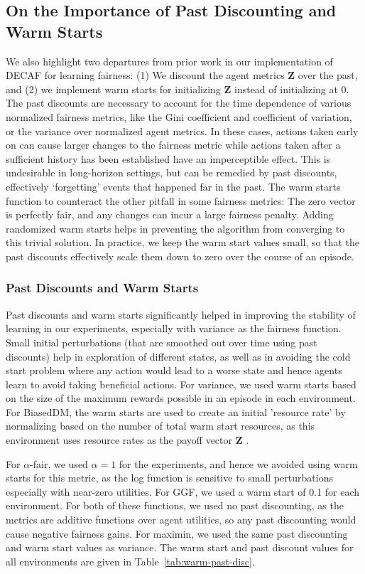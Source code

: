 \subsection{On the Importance of Past Discounting and Warm Starts}
We also highlight two departures from prior work in our implementation of DECAF for learning fairness: (1) We discount the agent metrics $\textbf{Z}$ over the past, and (2) we implement warm starts for initializing $\textbf{Z}$ instead of initializing at 0. The past discounts are necessary to account for the time dependence of various normalized fairness metrics, like the Gini coefficient and coefficient of variation, or the variance over normalized agent metrics. In these cases, actions taken early on can cause larger changes to the fairness metric while actions taken after a sufficient history has been established have an imperceptible effect. This is undesirable in long-horizon settings, but can be remedied by past discounts, effectively `forgetting' events that happened far in the past. The warm starts function to counteract the other pitfall in some fairness metrics: The zero vector is perfectly fair, and any changes can incur a large fairness penalty. Adding randomized warm starts helps in preventing the algorithm from converging to this trivial solution. In practice, we keep the warm start values small, so that the past discounts effectively scale them down to zero over the course of an episode.

\subsubsection{Past Discounts and Warm Starts}
Past discounts and warm starts significantly helped in improving the stability of learning in our experiments, especially with variance as the fairness function. Small initial perturbations (that are smoothed out over time using past discounts) help in exploration of different states, as well as in avoiding the cold start problem where any action would lead to a worse state and hence agents learn to avoid taking beneficial actions. For variance, we used warm starts based on the size of the maximum rewards possible in an episode in each environment. For BiasedDM, the warm starts are used to create an initial 'resource rate' by normalizing based on the number of total warm start resources, as this environment uses resource rates as the payoff vector $\textbf{Z}$ . 

For $\alpha$-fair, we used $\alpha=1$ for the experiments, and hence we avoided using warm starts for this metric, as the log function is sensitive to small perturbations especially with near-zero utilities. For GGF, we used a warm start of 0.1 for each environment. For both of these functions, we used no past discounting, as the metrics are additive functions over agent utilities, so any past discounting would cause negative fairness gains. 
For maximin, we used the same past discounting and warm start values as variance. The warm start and past discount values for all environments are given in Table~\ref{tab:warm-past-disc}.

